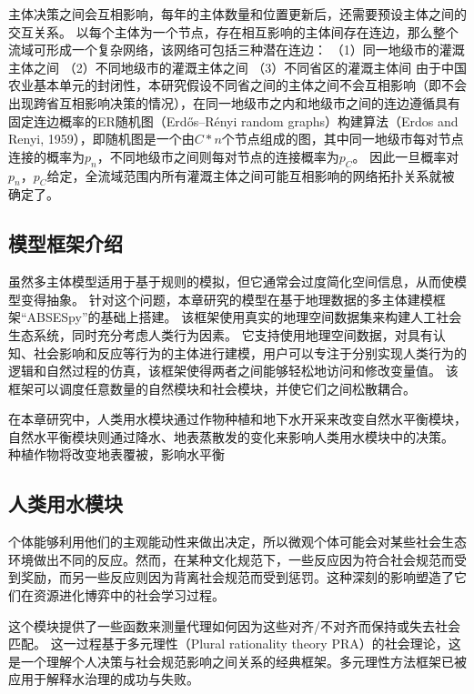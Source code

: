 主体决策之间会互相影响，每年的主体数量和位置更新后，还需要预设主体之间的交互关系。
以每个主体为一个节点，存在相互影响的主体间存在连边，那么整个流域可形成一个复杂网络，该网络可包括三种潜在连边：
（1）同一地级市的灌溉主体之间
（2）不同地级市的灌溉主体之间
（3）不同省区的灌溉主体间
由于中国农业基本单元的封闭性，本研究假设不同省之间的主体之间不会互相影响（即不会出现跨省互相影响决策的情况），在同一地级市之内和地级市之间的连边遵循具有固定连边概率的ER随机图（Erdős–Rényi random graphs）构建算法（Erdos and Renyi, 1959），即随机图是一个由$C * n$个节点组成的图，其中同一地级市每对节点连接的概率为$p_n$，不同地级市之间则每对节点的连接概率为$p_C$。
因此一旦概率对$p_n$，$p_C$给定，全流域范围内所有灌溉主体之间可能互相影响的网络拓扑关系就被确定了。

\subsection{模型框架介绍}

虽然多主体模型适用于基于规则的模拟，但它通常会过度简化空间信息，从而使模型变得抽象。
针对这个问题，本章研究的模型在基于地理数据的多主体建模框架“ABSESpy”的基础上搭建。
该框架使用真实的地理空间数据集来构建人工社会生态系统，同时充分考虑人类行为因素。
它支持使用地理空间数据，对具有认知、社会影响和反应等行为的主体进行建模，用户可以专注于分别实现人类行为的逻辑和自然过程的仿真，该框架使得两者之间能够轻松地访问和修改变量值。
该框架可以调度任意数量的自然模块和社会模块，并使它们之间松散耦合。

在本章研究中，人类用水模块通过作物种植和地下水开采来改变自然水平衡模块，自然水平衡模块则通过降水、地表蒸散发的变化来影响人类用水模块中的决策。
种植作物将改变地表覆被，影响水平衡

\subsection{人类用水模块}\label{ch6:sec:society}

个体能够利用他们的主观能动性来做出决定，所以微观个体可能会对某些社会生态环境做出不同的反应。然而，在某种文化规范下，一些反应因为符合社会规范而受到奖励，而另一些反应则因为背离社会规范而受到惩罚。这种深刻的影响塑造了它们在资源进化博弈中的社会学习过程。

这个模块提供了一些函数来测量代理如何因为这些对齐/不对齐而保持或失去社会匹配。
这一过程基于多元理性（Plural rationality theory PRA）的社会理论，这是一个理解个人决策与社会规范影响之间关系的经典框架。多元理性方法框架已被应用于解释水治理的成功与失败。  %

